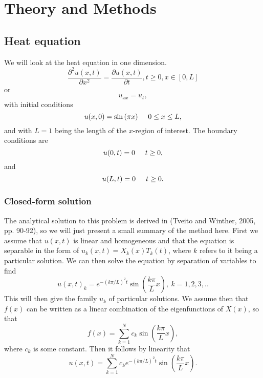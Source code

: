 \section{Theory and Methods}

\subsection{Heat equation}
We will look at the heat equation in one dimension.
\begin{equation*}
    \frac{\partial^2 u(x,t)}{\partial x^2} =\frac{\partial u(x,t)}{\partial t},
    t\geq 0, x\in [0,L]
\end{equation*}
or
\begin{equation*}
    u_{xx} = u_t,
\end{equation*}
with initial conditions
\begin{equation*}
    u(x,0)= \sin{(\pi x)} \hspace{0.5cm} 0 \leq x \leq L,
\end{equation*}
and with $L=1$ being the length of the $x$-region of interest. The 
boundary conditions are
\begin{equation*}
    u(0,t)= 0 \hspace{0.5cm} t \ge 0,
\end{equation*}
and
\begin{equation*}
    u(L,t)= 0 \hspace{0.5cm} t \ge 0.
\end{equation*}

\subsubsection{Closed-form solution}
The analytical solution to this problem is derived in (Tveito and
Winther, 2005, pp. 90-92)\cite{tveito}, so we will just present a small
summary of the method here. First we assume that $u(x,t)$ is linear and homogeneous and 
that the equation is separable in the form of $u_k(x,t)=X_k(x)T_k(t)$, where
$k$ refers to it being a particular solution. We can then solve the equation 
by separation of variables to find
\begin{equation*}
    u(x,t)_k=e^{-(k\pi/L)^2t}\sin{\left(\frac{k\pi}{L}x\right)},\ k=1,2,3,..
\end{equation*}
This will then give the family ${u_k}$ of particular solutions. We assume then
that $f(x)$ can be written as a linear combination of the eigenfunctions of
$X(x)$, so that
\begin{equation*}
    f(x)=\sum_{k=1}^{N} c_k \sin{\left(\frac{k\pi}{L}x\right)},
\end{equation*}
where $c_k$ is some constant. Then it follows by linearity that
\begin{equation*}
u(x,t)=\sum_{k=1}^N c_ke^{-(k\pi/L)^2t}\sin{\left(\frac{k\pi}{L}x\right)}.
\end{equation*}

